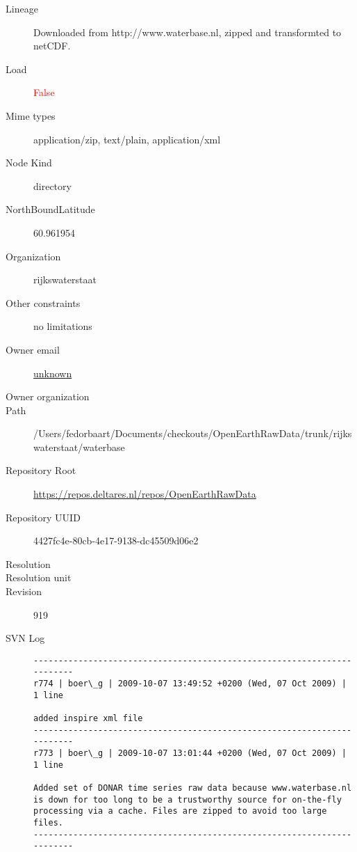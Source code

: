 \documentclass[9]{report}
\begin{document}
\begin{description}
  \item[Lineage] Downloaded from http://www.waterbase.nl, zipped and transformted to netCDF.
  \item[Load] \textcolor{red}{False}
  \item[Mime types] application/zip, text/plain, application/xml
  \item[Node Kind] directory
  \item[NorthBoundLatitude] 60.961954
  \item[Organization] rijkswaterstaat
  \item[Other constraints] no limitations
  \item[Owner email] \href{mailto:unknown}{unknown}
  \item[Owner organization] 
  \item[Path] /Users/fedorbaart/Documents/checkouts/OpenEarthRawData/trunk/rijkswaterstaat/waterbase
  \item[Repository Root] \href{https://repos.deltares.nl/repos/OpenEarthRawData}{https://repos.deltares.nl/repos/OpenEarthRawData}
  \item[Repository UUID] 4427fc4e-80cb-4e17-9138-dc45509d06e2
  \item[Resolution] 
  \item[Resolution unit] 
  \item[Revision] 919
  \item[SVN Log] \begin{verbatim}
------------------------------------------------------------------------
r774 | boer\_g | 2009-10-07 13:49:52 +0200 (Wed, 07 Oct 2009) | 1 line

added inspire xml file
------------------------------------------------------------------------
r773 | boer\_g | 2009-10-07 13:01:44 +0200 (Wed, 07 Oct 2009) | 1 line

Added set of DONAR time series raw data because www.waterbase.nl is down for too long to be a trustworthy source for on-the-fly processing via a cache. Files are zipped to avoid too large files.
------------------------------------------------------------------------


\end{verbatim}
\end{description}
\end{document}

